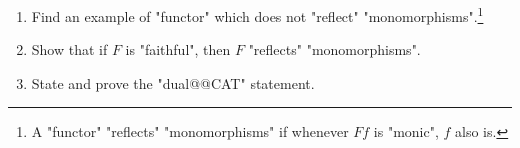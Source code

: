 \documentclass[main.tex]{subfiles}
\begin{document}
\begin{exer}\label{exer:duality:reflecting}
	\begin{enumerate}
		\item Find an example of "functor" which does not "reflect" "monomorphisms".\footnote{A "functor" "reflects" "monomorphisms" if whenever $Ff$ is "monic", $f$ also is.}
		\item Show that if $F$ is "faithful", then $F$ "reflects" "monomorphisms".
		\item State and prove the "dual@@CAT" statement.
	\end{enumerate}
\end{exer}

%
\end{document}

